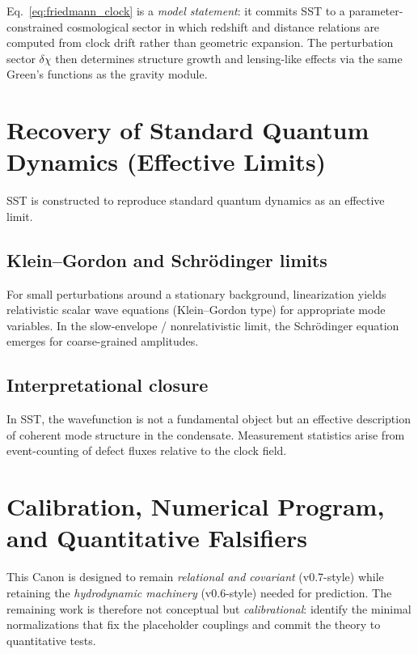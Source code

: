 \documentclass[10pt]{article}
\begin{document}
Eq.~\eqref{eq:friedmann_clock} is a \emph{model statement}: it commits SST to a
parameter-constrained cosmological sector in which redshift and distance relations
are computed from clock drift rather than geometric expansion. The perturbation
sector $\delta\chi$ then determines structure growth and lensing-like effects via
the same Green's functions as the gravity module.


\section{Recovery of Standard Quantum Dynamics (Effective Limits)}
    \label{sec:qm_limits}

    SST is constructed to reproduce standard quantum dynamics as an effective limit.

    \subsection{Klein--Gordon and Schr\"odinger limits}

        For small perturbations around a stationary background, linearization yields
        relativistic scalar wave equations (Klein--Gordon type) for appropriate mode
        variables. In the slow-envelope / nonrelativistic limit, the Schr\"odinger
        equation emerges for coarse-grained amplitudes.

    \subsection{Interpretational closure}

        In SST, the wavefunction is not a fundamental object but an effective
        description of coherent mode structure in the condensate. Measurement
        statistics arise from event-counting of defect fluxes relative to the
        clock field.

    
    \section{Calibration, Numerical Program, and Quantitative Falsifiers}
    \label{sec:calibration_program}

This Canon is designed to remain \emph{relational and covariant} (v0.7-style) while
retaining the \emph{hydrodynamic machinery} (v0.6-style) needed for prediction.
The remaining work is therefore not conceptual but \emph{calibrational}: identify
the minimal normalizations that fix the placeholder couplings and commit the theory
to quantitative tests.
\end{document}
